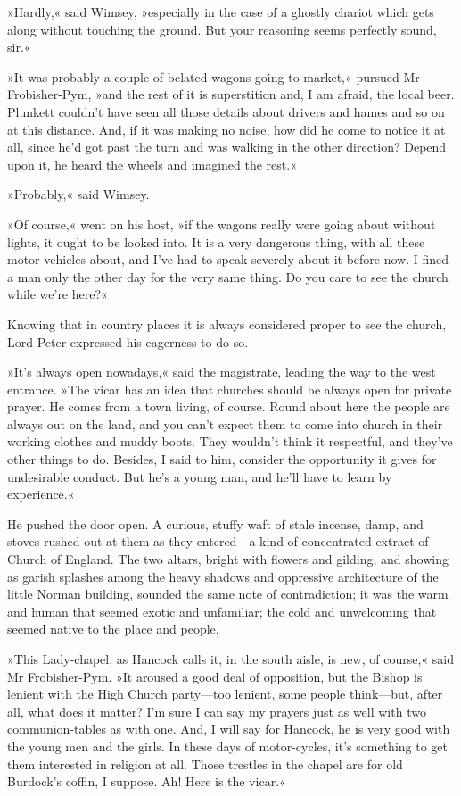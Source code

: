 »Hardly,« said Wimsey, »especially in the case of a ghostly chariot which gets along without touching the ground. But your reasoning seems perfectly sound, sir.«

»It was probably a couple of belated wagons going to market,« pursued Mr Frobisher-Pym, »and the rest of it is superstition and, I am afraid, the local beer. Plunkett couldn't have seen all those details about drivers and hames and so on at this distance. And, if it was making no noise, how did he come to notice it at all, since he'd got past the turn and was walking in the other direction? Depend upon it, he heard the wheels and imagined the rest.«

»Probably,« said Wimsey.

»Of course,« went on his host, »if the wagons really were going about without lights, it ought to be looked into. It is a very dangerous thing, with all these motor vehicles about, and I've had to speak severely about it before now. I fined a man only the other day for the very same thing. Do you care to see the church while we're here?«

Knowing that in country places it is always considered proper to see the church, Lord Peter expressed his eagerness to do so.

»It's always open nowadays,« said the magistrate, leading the way to the west entrance. »The vicar has an idea that churches should be always open for private prayer. He comes from a town living, of course. Round about here the people are always out on the land, and you can't expect them to come into church in their working clothes and muddy boots. They wouldn't think it respectful, and they've other things to do. Besides, I said to him, consider the opportunity it gives for undesirable conduct. But he's a young man, and he'll have to learn by experience.«

He pushed the door open. A curious, stuffy waft of stale incense, damp, and stoves rushed out at them as they entered—a kind of concentrated extract of Church of England. The two altars, bright with flowers and gilding, and showing as garish splashes among the heavy shadows and oppressive architecture of the little Norman building, sounded the same note of contradiction; it was the warm and human that seemed exotic and unfamiliar; the cold and unwelcoming that seemed native to the place and people.

»This Lady-chapel, as Hancock calls it, in the south aisle, is new, of course,« said Mr Frobisher-Pym. »It aroused a good deal of opposition, but the Bishop is lenient with the High Church party—too lenient, some people think—but, after all, what does it matter? I'm sure I can say my prayers just as well with two communion-tables as with one. And, I will say for Hancock, he is very good with the young men and the girls. In these days of motor-cycles, it's something to get them interested in religion at all. Those trestles in the chapel are for old Burdock's coffin, I suppose. Ah! Here is the vicar.«

